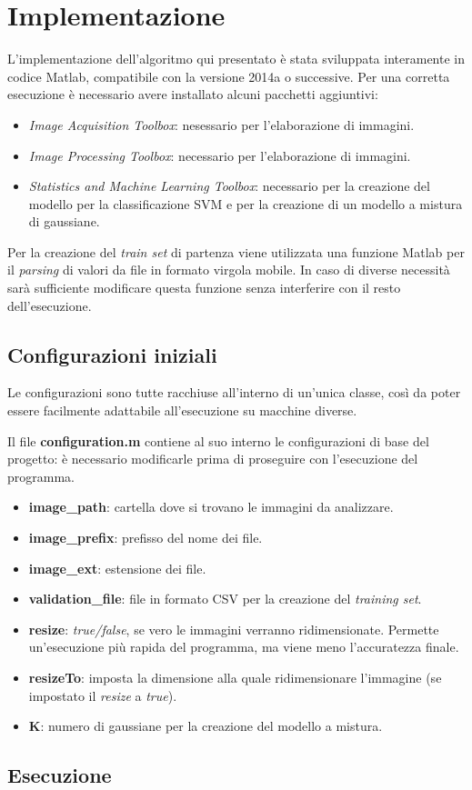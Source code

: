 \section{Implementazione}

L'implementazione dell'algoritmo qui presentato è stata sviluppata interamente in codice Matlab, compatibile con la versione 2014a o successive. 
Per una corretta esecuzione è necessario avere installato alcuni pacchetti aggiuntivi:

\begin{itemize}
\item \emph{Image Acquisition Toolbox}: nesessario per l'elaborazione di immagini.
\item \emph{Image Processing Toolbox}: necessario per l'elaborazione di immagini.
\item \emph{Statistics and Machine Learning Toolbox}: necessario per la creazione del modello per la classificazione SVM e per la creazione di un modello a mistura di gaussiane.
\end{itemize}

Per la creazione del \emph{train set} di partenza viene utilizzata una funzione Matlab per il \emph{parsing} di valori da file in formato virgola mobile. In caso di diverse necessità sarà sufficiente modificare questa funzione senza interferire con il resto dell'esecuzione.

\subsection{Configurazioni iniziali}

Le configurazioni sono tutte racchiuse all'interno di un'unica classe, così da poter essere facilmente adattabile all'esecuzione su macchine diverse. 

Il file \textbf{configuration.m} contiene al suo interno le configurazioni di base del progetto: è necessario modificarle prima di proseguire con l'esecuzione del programma.

\begin{itemize}
\item \textbf{image\_path}: cartella dove si trovano le immagini da analizzare.
\item \textbf{image\_prefix}: prefisso del nome dei file.
\item \textbf{image\_ext}: estensione dei file.
\item \textbf{validation\_file}: file in formato CSV per la creazione del \emph{training set}.
\item \textbf{resize}: \emph{true/false}, se vero le immagini verranno ridimensionate. Permette un'esecuzione più rapida del programma, ma viene meno l'accuratezza finale.
\item \textbf{resizeTo}: imposta la dimensione alla quale ridimensionare l'immagine (se impostato il \emph{resize} a \emph{true}).
\item \textbf{K}: numero di gaussiane per la creazione del modello a mistura.
\end{itemize}

\subsection{Esecuzione}